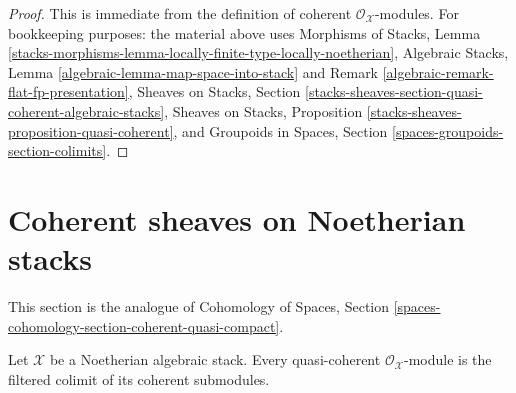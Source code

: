 \begin{proof}
This is immediate from the definition of coherent
$\mathcal{O}_\mathcal{X}$-modules.
For bookkeeping purposes: the material above uses
Morphisms of Stacks, Lemma
\ref{stacks-morphisms-lemma-locally-finite-type-locally-noetherian},
Algebraic Stacks, Lemma \ref{algebraic-lemma-map-space-into-stack} and
Remark \ref{algebraic-remark-flat-fp-presentation},
Sheaves on Stacks, Section
\ref{stacks-sheaves-section-quasi-coherent-algebraic-stacks},
Sheaves on Stacks, Proposition \ref{stacks-sheaves-proposition-quasi-coherent},
and Groupoids in Spaces, Section
\ref{spaces-groupoids-section-colimits}.
\end{proof}






\section{Coherent sheaves on Noetherian stacks}
\label{section-coherent-on-noetherian}

\noindent
This section is the analogue of
Cohomology of Spaces, Section
\ref{spaces-cohomology-section-coherent-quasi-compact}.

\begin{lemma}
\label{lemma-directed-colimit-coherent}
Let $\mathcal{X}$ be a Noetherian algebraic stack. Every quasi-coherent
$\mathcal{O}_\mathcal{X}$-module is the filtered colimit of its coherent
submodules.
\end{lemma}

